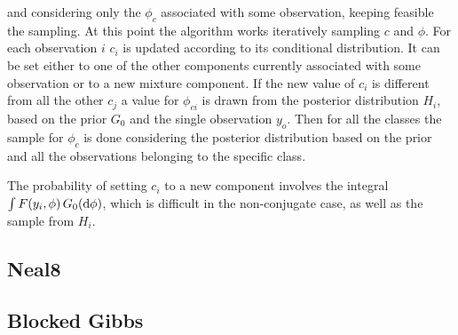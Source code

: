 and considering only the $\phi_c$ associated with some observation, keeping feasible the sampling. At this point the algorithm works iteratively sampling $c$ and $\phi$. For each observation $i$ $c_i$ is updated according to its conditional distribution. It can be set either to one of the other components currently associated with some observation or to a new mixture component.  If the new value of $c_i$ is different from all the other $c_j$ a value for $\phi_{ci}$ is drawn from the posterior distribution $H_i$, based on the prior $G_0$ and the single observation $y_o$. Then for all the classes the  sample for $\phi_c$ is done considering the posterior distribution based on the prior and all the observations belonging to the specific class.

The probability of setting $c_i$ to a new component involves the integral $\int F(y_{i},\phi) \, G_0(\mathrm d\phi)$, which is difficult in the non-conjugate case, as well as the sample from $H_i$.

\subsection{Neal8}

\subsection{Blocked Gibbs}
